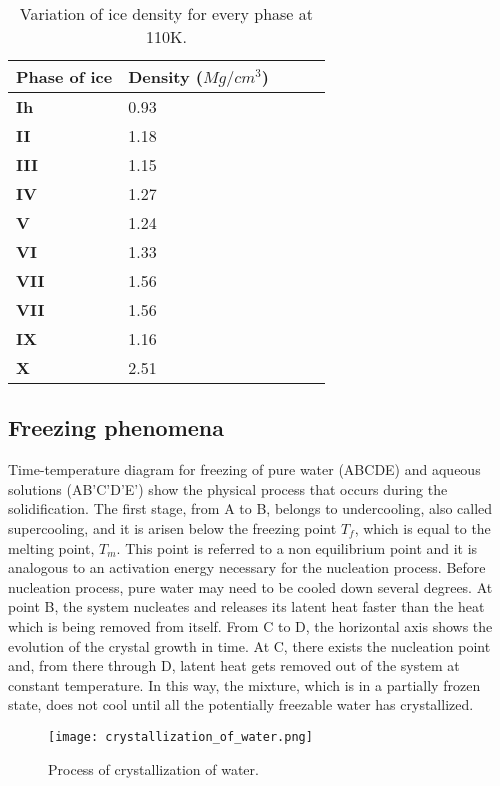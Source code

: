 \begin{table}[h!]
	\begin{tabular}{@{}lllll@{}}
		\toprule[1pt]
		\textbf{Phase of ice} & \textbf{Density ($Mg/cm^{3}$)} \\ \midrule[2pt]
		\textbf{Ih} &  0.93 \\
		\textbf{II} &  1.18 \\
		\textbf{III} & 1.15  \\
		\textbf{IV} & 1.27  \\
		\textbf{V} &  1.24 \\
		\textbf{VI} & 1.33  \\
		\textbf{VII} & 1.56	\\
		\textbf{VII} & 1.56	\\
		\textbf{IX} & 1.16  \\
		\textbf{X} &  2.51 \\  \bottomrule[1pt]		
	\end{tabular}
	\centering
	\caption{Variation of ice density for every phase at 110K.}	
	\label{1.1tab}
\end{table}
\subsection{Freezing phenomena}
Time-temperature diagram for freezing of pure water (ABCDE) and aqueous solutions (AB'C'D'E') show the physical process that occurs during the solidification. The first stage, from A to B, belongs to undercooling, also called supercooling, and it is arisen below the freezing point $T_f$, which is equal to the melting point, $T_m$. This point is referred to a non equilibrium point and it is analogous to an activation energy necessary for the nucleation process. Before nucleation process, pure water may need to be cooled down several degrees. At point B, the system nucleates and releases its latent heat faster than the heat which is being removed from itself.
\newline
From C to D, the horizontal axis shows the evolution of the crystal growth in time. At C, there exists the nucleation point and, from there through D, latent heat gets removed out of the system at constant temperature. In this way, the mixture, which is in a partially frozen state, does not cool until all the potentially freezable water has crystallized.
\clearpage

\begin{figure}[h]
	\label{1.7fig}	\centering	
	\texttt{[image: crystallization\_of\_water.png]}
	\caption{Process of crystallization of water.}
\end{figure} 


